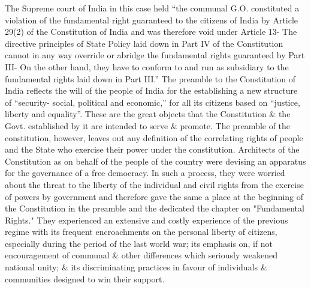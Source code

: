 \begin{multicols}{2}
\noi
The Supreme court of India in this case held “the communal G.O. constituted a violation of the fundamental right guaranteed to the citizens of India by Article 29(2) of the Constitution of India and was therefore void under Article 13- The directive principles of State Policy laid down in Part IV of the Constitution cannot in any way override or abridge the fundamental rights guaranteed by Part III- On the other hand, they have to conform to and run as subsidiary to the fundamental rights laid down in Part III.” The preamble to the Constitution of India reflects the will of the people of India for the establishing a new structure of “security- social, political and economic,” for all its citizens based on “justice, liberty and equality”. These are the great objects that the Constitution \& the Govt. established by it are intended to serve \& promote. The preamble of the constitution, however, leaves out any definition of the correlating rights of people and the State who exercise their power under the constitution. Architects of the Constitution as on behalf of the people of the country were devising an apparatus for the governance of a free democracy. In such a process, they were worried about the threat to the liberty of the individual and civil rights from the exercise of powers by government and therefore gave the same a place at the beginning of the Constitution in the preamble and the dedicated the chapter on "Fundamental Rights." They experienced an extensive and costly experience of the previous regime with its frequent encroachments on the personal liberty of citizens, especially during the period of the last world war; its emphasis on, if not encouragement of communal \& other differences which seriously weakened national unity; \& its discriminating practices in favour of individuals \& communities designed to win their support.


\end{multicols}
